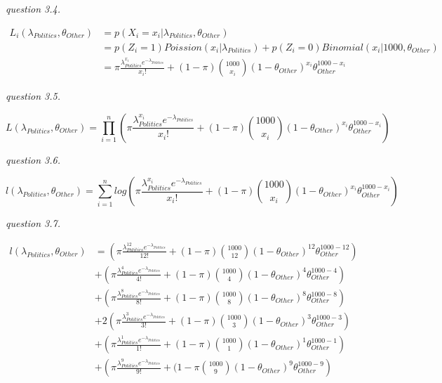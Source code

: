 \documentclass{article}
\begin{document}
\vspace{\baselineskip}
\textit{question 3.4.}

\begin{align*}
    L_i(\lambda_{Politics}, \theta_{Other})&=p(X_i=x_i|\lambda_{Politics}, \theta_{Other})\\&=p(Z_i=1)Poission(x_i|\lambda_{Politics})+p(Z_i=0)Binomial(x_i|1000,\theta_{Other})\\&=\pi\frac{\lambda_{Politics}^{x_i}e^{-\lambda_{Politics}}}{x_i!}+(1-\pi){1000\choose x_i}{(1-\theta_{Other})}^{x_i}\theta_{Other}^{1000-x_i} 
\end{align*}


\vspace{\baselineskip}
\textit{question 3.5.}

$$L(\lambda_{Politics}, \theta_{Other})=\prod_{i=1}^n\left(\pi\frac{\lambda_{Politics}^{x_i}e^{-\lambda_{Politics}}}{x_i!}+(1-\pi){1000\choose x_i}{(1-\theta_{Other})}^{x_i}\theta_{Other}^{1000-x_i}\right)$$

\vspace{\baselineskip}
\textit{question 3.6.}

$$l(\lambda_{Politics}, \theta_{Other})=\sum_{i=1}^nlog\left(\pi\frac{\lambda_{Politics}^{x_i}e^{-\lambda_{Politics}}}{x_i!}+(1-\pi){1000\choose x_i}{(1-\theta_{Other})}^{x_i}\theta_{Other}^{1000-x_i}\right)$$

\vspace{\baselineskip}
\textit{question 3.7.}

\begin{align*}
    l(\lambda_{Politics}, \theta_{Other})&=\left(\pi\frac{\lambda_{Politics}^{12}e^{-\lambda_{Politics}}}{12!}+(1-\pi){1000\choose 12}{(1-\theta_{Other})}^{12}\theta_{Other}^{1000-12}\right)\\&+\left(\pi\frac{\lambda_{Politics}^{4}e^{-\lambda_{Politics}}}{4!}+(1-\pi){1000\choose 4}{(1-\theta_{Other})}^{4}\theta_{Other}^{1000-4}\right)\\&+\left(\pi\frac{\lambda_{Politics}^{8}e^{-\lambda_{Politics}}}{8!}+(1-\pi){1000\choose 8}{(1-\theta_{Other})}^{8}\theta_{Other}^{1000-8}\right)\\&+2\left(\pi\frac{\lambda_{Politics}^{3}e^{-\lambda_{Politics}}}{3!}+(1-\pi){1000\choose 3}{(1-\theta_{Other})}^{3}\theta_{Other}^{1000-3}\right)\\&+\left(\pi\frac{\lambda_{Politics}^{1}e^{-\lambda_{Politics}}}{1!}+(1-\pi){1000\choose 1}{(1-\theta_{Other})}^{1}\theta_{Other}^{1000-1}\right)\\&+\left(\pi\frac{\lambda_{Politics}^{9}e^{-\lambda_{Politics}}}{9!}+(1-\pi{1000\choose 9}{(1-\theta_{Other})}^{9}\theta_{Other}^{1000-9}\right)
\end{align*}
\end{document}
